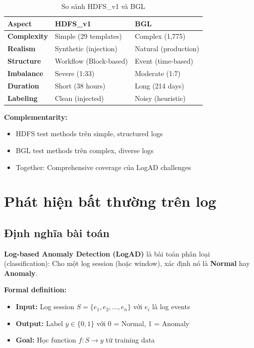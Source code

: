 \begin{table}[h]
\centering
\caption{So sánh HDFS\_v1 và BGL}
\label{tab:dataset-comparison}
\begin{tabular}{lll}
\toprule
\textbf{Aspect} & \textbf{HDFS\_v1} & \textbf{BGL} \\
\midrule
\textbf{Complexity} & Simple (29 templates) & Complex (1,775) \\
\textbf{Realism} & Synthetic (injection) & Natural (production) \\
\textbf{Structure} & Workflow (Block-based) & Event (time-based) \\
\textbf{Imbalance} & Severe (1:33) & Moderate (1:7) \\
\textbf{Duration} & Short (38 hours) & Long (214 days) \\
\textbf{Labeling} & Clean (injected) & Noisy (heuristic) \\
\bottomrule
\end{tabular}
\end{table}

\textbf{Complementarity:}
\begin{itemize}
    \item HDFS test methods trên simple, structured logs
    \item BGL test methods trên complex, diverse logs
    \item Together: Comprehensive coverage của LogAD challenges
\end{itemize}

\section{Phát hiện bất thường trên log}
\label{sec:log-anomaly-detection}

\subsection{Định nghĩa bài toán}

\textbf{Log-based Anomaly Detection (LogAD)} là bài toán phân loại (classification): Cho một log session (hoặc window), xác định nó là \textbf{Normal} hay \textbf{Anomaly}.

\textbf{Formal definition:}

\begin{itemize}
    \item \textbf{Input:} Log session $S = \{e_1, e_2, ..., e_n\}$ với $e_i$ là log events
    \item \textbf{Output:} Label $y \in \{0, 1\}$ với 0 = Normal, 1 = Anomaly
    \item \textbf{Goal:} Học function $f: S \rightarrow y$ từ training data
\end{itemize}

